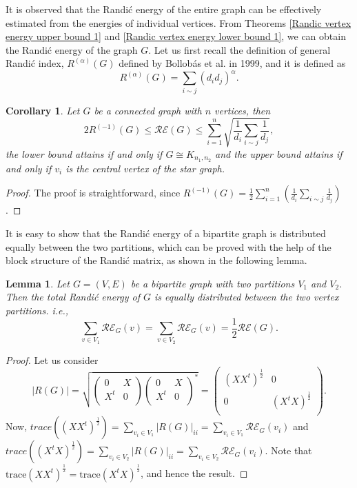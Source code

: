 \documentclass[10 pt]{article}
\newtheorem{lemma}{Lemma}[section]
\newtheorem{corollary}{Corollary}[section]
\numberwithin{equation}{section}
\begin{document}
It is observed that the Randi\'c energy of the entire graph can be effectively estimated from the energies of individual vertices. From Theorems \ref{Randic vertex energy upper bound 1} and \ref{Randic vertex energy lower bound 1}, we can obtain the Randi\'c energy of the graph $G$. Let us first recall the definition of general Randi\'c index, $R^{(\alpha)}(G)$ defined by Bollob\'as et al. \cite{Bollobas1999} in 1999, and it is defined as $$R^{(\alpha)}(G)=\sum\limits_{i\sim j}(d_i d_j)^\alpha.$$

\begin{corollary}
Let $G$ be a connected graph with $n$ vertices, then
$$2R^{(-1)}(G)\leq\mathcal{RE}(G)\leq \sum\limits_{i=1}^n\sqrt{\frac{1}{d_i}\sum\limits_{i\sim j}\frac{1}{d_j}},$$
the lower bound attains if and only if $G\cong K_{n_1,n_2}$ and the upper bound attains if and only if $v_i$ is the central vertex of the star graph.
\end{corollary}
\begin{proof}
The proof is straightforward, since $R^{(-1)}(G)=\frac{1}{2}\sum\limits_{i=1}^n\left(\frac{1}{d_i}\sum\limits_{i\sim j}\frac{1}{d_j}\right)$.
\end{proof}

It is easy to show that the Randi\'c energy of a bipartite graph is distributed equally between the two partitions, which can be proved with the help of the block structure of the Randi\'c matrix, as shown in the following lemma.

\begin{lemma}\label{lemma Randic vertex energy bipartite}
Let $G=(V,E)$ be a bipartite graph with two partitions $V_1$ and $V_2$. Then the total Randi\'c energy of $G$ is equally distributed between the two vertex partitions. i.e.,
$$\sum\limits_{v\in V_1}\mathcal{RE}_G(v)=\sum\limits_{v\in V_2}\mathcal{RE}_G(v)=\frac{1}{2}\mathcal{RE}(G).$$
\end{lemma}
\begin{proof}
Let us consider
$$|R(G)|=\sqrt{\left(
  \begin{array}{c|c}
    0 & X \\
    \hline
    X^t & 0 \\
  \end{array}
\right)\left(
  \begin{array}{c|c}
    0 & X \\
    \hline
    X^t & 0 \\
  \end{array}
\right)^*}=\left(
  \begin{array}{c|c}
    \left(XX^t\right)^{\frac{1}{2}} & 0 \\
    \hline
    0& \left(X^tX\right)^{\frac{1}{2}} \\
  \end{array}
\right).$$
Now, $trace\left(\left(XX^t\right)^{\frac{1}{2}}\right)=\sum\limits_{v_i\in V_1}|R(G)|_{ii}=\sum\limits_{v_i\in V_1}\mathcal{RE}_G(v_i)$ and $trace\left(\left(X^tX\right)^{\frac{1}{2}}\right)=\sum\limits_{v_i\in V_2}|R(G)|_{ii}=\sum\limits_{v_i\in V_2}\mathcal{RE}_G(v_i)$. Note that $\text{trace}\left(XX^t\right)^{\frac{1}{2}}=\text{trace}\left(X^tX\right)^{\frac{1}{2}}$, and hence the result.
\end{proof}
\end{document}
